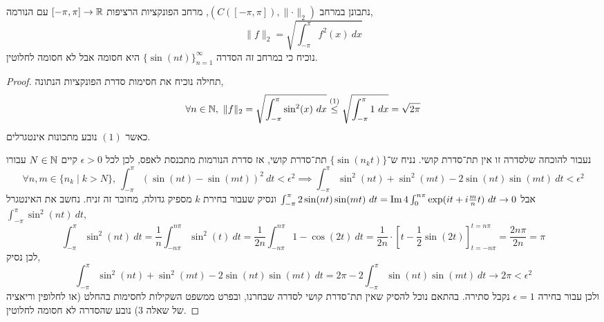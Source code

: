 \question{}
נתבונן במרחב $(C([-\pi, \pi]), \lVert \cdot \rVert_2)$, מרחב הפונקציות הרציפות $[-\pi, \pi] \to \mathbb{R}$ עם הנורמה,
\[
	\lVert f \rVert_2
	= \sqrt{\int_{-\pi}^{\pi} f^2(x)\ dx}
\]
נוכיח כי במרחב זה הסדרה ${\{ \sin(nt) \}}_{n = 1}^\infty$ היא חסומה אבל לא חסומה לחלוטין.
\begin{proof}
	תחילה נוכיח את חסימות סדרת הפונקציות הנתונה,
	\[
		\forall n \in \NN,\ 
		\lVert f \rVert_2
		= \sqrt{\int_{-\pi}^{\pi} \sin^2(x)\ dx}
		\overset{(1)}{\le} \sqrt{\int_{-\pi}^{\pi} 1\ dx}
		= \sqrt{2\pi}
	\]
	כאשר $(1)$ נובע מתכונות אינטגרלים.

	נעבור להוכחה שלסדרה זו אין תת־סדרת קושי.
	נניח ש־$\{ \sin(n_k t) \}$ תת־סדרת קושי, אז סדרת הנורמות מתכנסת לאפס, לכן לכל $\epsilon > 0$ קיים $N \in \mathbb{N}$ עבורו
	\[
		\forall n, m \in \{ n_k \mid k > N \},\ \int_{-\pi}^{\pi} {(\sin(nt) - \sin(mt))}^2\ dt < \epsilon^2
		\implies \int_{-\pi}^{\pi} \sin^2(nt) + \sin^2(mt) - 2\sin(nt)\sin(mt)\ dt < \epsilon^2
	\]
	אבל $\int_{-\pi}^{\pi} 2\sin(nt)\sin(mt)\ dt = \operatorname{Im} 4 \int_0^{n\pi} \exp(it + i \frac{m}{n} t)\ dt \to 0$ ונסיק שעבור בחירת $k$ מספיק גדולה, מחובר זה זניח.
	נחשב את האינטגרל $\int_{-\pi}^{\pi} \sin^2(nt)\ dt$,
	\[
		\int_{-\pi}^{\pi} \sin^2(nt)\ dt
		= \frac{1}{n} \int_{-n\pi}^{n\pi} \sin^2(t)\ dt
		= \frac{1}{2n} \int_{-n\pi}^{n\pi} 1 - \cos(2t)\ dt
		= \frac{1}{2n} \cdot {\left[ t - \frac{1}{2} \sin(2t) \right]}_{t = -n\pi}^{t = n\pi}
		= \frac{2n\pi}{2n}
		= \pi
	\]
	לכן נסיק,
	\[
		\int_{-\pi}^{\pi} \sin^2(nt) + \sin^2(mt) - 2\sin(nt)\sin(mt)\ dt
		= 2\pi - 2\int_{-\pi}^{\pi} \sin(nt)\sin(mt)\ dt
		\to 2\pi
		< \epsilon^2
	\]
	ולכן עבור בחירה $\epsilon = 1$ נקבל סתירה.
	בהתאם נוכל להסיק שאין תת־סדרת קושי לסדרה שבחרנו, ובפרט ממשפט השקילות לחסימות בהחלט (או לחלופין וריאציה של שאלה 3) נובע שהסדרה לא חסומה לחלוטין.
\end{proof}


